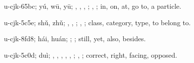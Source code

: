 \begin{multicols}{2}
{\cjkgGlue{}u-cjk-65bc; yú, wū, yū; \cjkgGlue{}\cjkgGlue{}\cjkgGlue{}, \cjkgGlue{}\cjkgGlue{}\cjkgGlue{}, \cjkgGlue{}, \cjkgGlue{}; \cjkgGlue{}, \cjkgGlue{}; in, on, at, go to, a particle.

\cjkgGlue{}u-cjk-5c5e; shǔ, zhǔ; \cjkgGlue{}, \cjkgGlue{}, \cjkgGlue{}; \cjkgGlue{}, \cjkgGlue{}; class, category, type, to belong to.

\cjkgGlue{}u-cjk-8fd8; hái, huán; \cjkgGlue{}\cjkgGlue{}\cjkgGlue{}; \cjkgGlue{}; still, yet, also, besides.

\cjkgGlue{}u-cjk-5c0d; duì; \cjkgGlue{}, \cjkgGlue{}\cjkgGlue{}\cjkgGlue{}, \cjkgGlue{}\cjkgGlue{}\cjkgGlue{}, \cjkgGlue{}\cjkgGlue{}\cjkgGlue{}, \cjkgGlue{}\cjkgGlue{}\cjkgGlue{}, \cjkgGlue{}\cjkgGlue{}\cjkgGlue{}; \cjkgGlue{}, \cjkgGlue{}; correct, right, facing, opposed.

}
\end{multicols}
